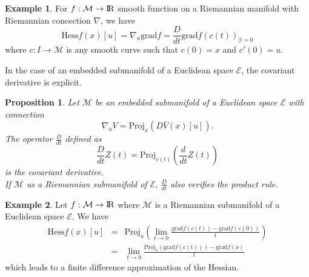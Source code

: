 \documentclass[10pt,a4paper]{book}
\theoremstyle{definition}
\newtheorem{exm}{Example}[section]
\theoremstyle{plain}
\newtheorem{prop}{Proposition}[section]
\theoremstyle{remark}
\newcommand{\grad}{\textrm{grad}}
\newcommand{\E}{\mathcal{E}}
\newcommand \M {\mathcal{M}}
\def\R{{\rm I\kern-0.16em R}}
\begin{document}
\begin{exm}
For $f: \M \to \R$ smooth function on a Riemannian manifold with Riemannian concection $\nabla$, we have
$$\text{Hess} f(x)[u]=\nabla_u\grad f=\frac{D}{dt}\grad f(c(t))_{\mid t=0}$$
where $c:I\to \M$ is any smooth curve such that $c(0)=x$ and $c'(0)=u$.
\end{exm}
In the case of an embedded submanifold of a Euclidean space $\E$, the covariant derivative is explicit.
\begin{prop}
Let $\M$ be an embedded submanifold of a Euclidean space $\E$ with connection 
$$\nabla_uV=\text{Proj}_x(D\bar{V}(x)[u]).$$
The operator $\frac{D}{dt}$ defined as
$$\frac{D}{dt}Z(t)=\text{Proj}_{c(t)}\left(\frac{d}{dt}Z(t)\right)$$
is the covariant derivative.\\ If $\M$ us a Riemannian submanifold of $\E,~\frac{D}{dt}$ also verifies the product rule.
\end{prop}
\begin{exm}
Let $f:\M\to \R$ where $\M$ is a Riemannian submanifold of a Euclidean space $\E$. We have
\begin{eqnarray*}
\text{Hess} f(x)[u]&=&\text{Proj}_x\left(\lim_{t\to 0}\frac{\grad f(c(t))-\grad f(c(0))}{t}\right)\\&=&\lim_{t\to 0}\frac{\text{Proj}_x(\grad f(c(t)))-\grad f(x)}{t}
\end{eqnarray*}
which leads to a finite difference approximation of the Hessian.
\end{exm}
\end{document}
